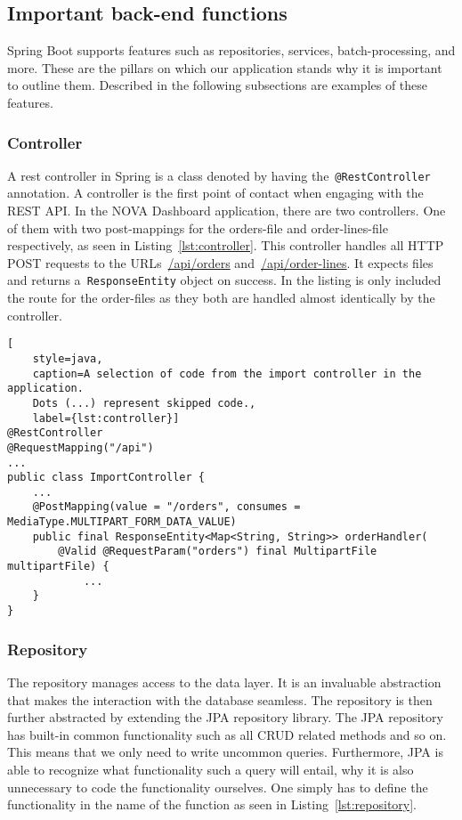 \subsection{Important back-end functions}\label{subsec:important-back-end-functions}

Spring Boot supports features such as repositories, services, batch-processing, and more.
These are the pillars on which our application stands why it is important to outline them.
Described in the following subsections are examples of these features.

\subsubsection{Controller}

A rest controller in Spring is a class denoted by having the~\texttt{@RestController} annotation.
A controller is the first point of contact when engaging with the REST API\@.
In the NOVA Dashboard application, there are two controllers.
One of them with two post-mappings for the orders-file and order-lines-file respectively, as seen in
Listing~\ref{lst:controller}.
This controller handles all HTTP POST requests to the URLs~\url{/api/orders} and~\url{/api/order-lines}.
It expects files and returns a~\texttt{ResponseEntity} object on success.
In the listing is only included the route for the order-files as they both are handled almost identically by the
controller.

\begin{lstlisting}[
    style=java,
    caption=A selection of code from the import controller in the application.
    Dots (...) represent skipped code.,
    label={lst:controller}]
@RestController
@RequestMapping("/api")
...
public class ImportController {
    ...
    @PostMapping(value = "/orders", consumes = MediaType.MULTIPART_FORM_DATA_VALUE)
    public final ResponseEntity<Map<String, String>> orderHandler(
        @Valid @RequestParam("orders") final MultipartFile multipartFile) {
            ...
    }
}
\end{lstlisting}

\subsubsection{Repository}

The repository manages access to the data layer.
It is an invaluable abstraction that makes the interaction with the database seamless.
The repository is then further abstracted by extending the JPA repository library.
The JPA repository has built-in common functionality such as all CRUD related methods and so on.
This means that we only need to write uncommon queries.
Furthermore, JPA is able to recognize what functionality such a query will entail,
why it is also unnecessary to code the functionality ourselves.
One simply has to define the functionality in the name of the function as seen in Listing~\ref{lst:repository}.

